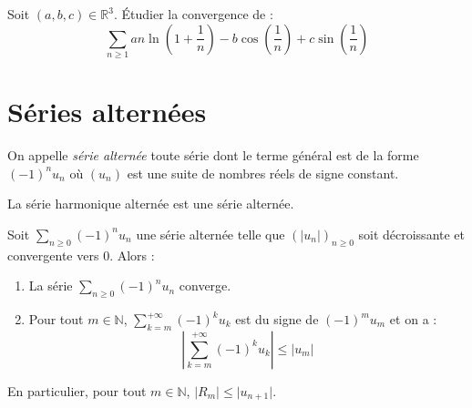 \documentclass[french,11pt,twoside]{VcCours}
\newcommand{\Sum}[2]{\ensuremath{\textstyle{\sum\limits_{#1}^{#2}}}}
\begin{document}
\begin{exa} Soit $(a,b,c) \in \mathbb{R}^3$. Étudier la convergence de :
$$ \Sum{n \geq 1}{} a n \ln \left(1 + \frac{1}{n} \right) - b \cos \left( \frac{1}{n} \right) + c \sin \left( \frac{1}{n} \right)$$
\end{exa}

\section{Séries alternées}

\begin{defin} On appelle \textit{série alternée} toute série dont le terme général est de la forme $(-1)^n u_n$ où $(u_n)$ est une suite de nombres réels de signe constant.
\end{defin}

\begin{ex} La série harmonique alternée est une série alternée.
\end{ex}

\begin{thm}
Soit $\Sum{n \geq 0}{} (-1)^n u_n$ une série alternée telle que $(\vert u_n \vert)_{n \geq 0}$ soit décroissante et convergente vers $0$. Alors :
\begin{enumerate}
\item La série $\Sum{n \geq 0}{} (-1)^n u_n$ converge.
\item Pour tout $m \in \mathbb{N}$, $\Sum{k=m}{+ \infty} (-1)^k u_k$ est du signe de $(-1)^m u_m$ et on a :
$$ \left\vert \sum_{k=m}^{+ \infty} (-1)^k u_k \right\vert \leq \vert u_m \vert$$
\end{enumerate}
\end{thm}

\begin{rem} En particulier, pour tout $m \in \mathbb{N}$, $\vert R_m \vert \leq \vert u_{n+1} \vert$.
\end{rem}
\end{document}
